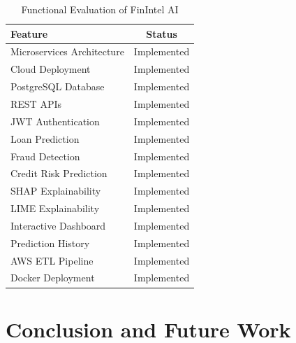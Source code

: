 \documentclass[conference]{IEEEtran}
\begin{document}
\begin{table}[ht]

\centering

\caption{Functional Evaluation of FinIntel AI}

\begin{tabular}{lc}

\toprule

Feature & Status \\

\midrule

Microservices Architecture & Implemented \\

Cloud Deployment & Implemented \\

PostgreSQL Database & Implemented \\

REST APIs & Implemented \\

JWT Authentication & Implemented \\

Loan Prediction & Implemented \\

Fraud Detection & Implemented \\

Credit Risk Prediction & Implemented \\

SHAP Explainability & Implemented \\

LIME Explainability & Implemented \\

Interactive Dashboard & Implemented \\

Prediction History & Implemented \\

AWS ETL Pipeline & Implemented \\

Docker Deployment & Implemented \\

\bottomrule

\end{tabular}

\end{table}

\section{Conclusion and Future Work}
\end{document}
